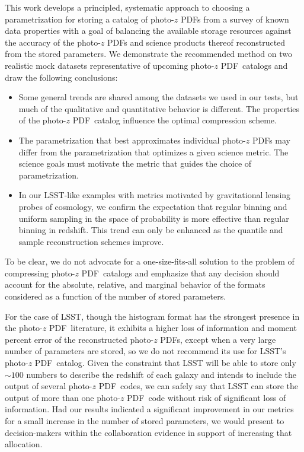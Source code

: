 \documentclass[\docopts]{\docclass}
\newcommand{\pz}{photo-$z$ PDF}
\begin{document}
This work develops a principled, systematic approach to choosing a 
parametrization for storing a catalog of \pz s from a survey of known data 
properties with a goal of balancing the available storage resources against the 
accuracy of the \pz s and science products thereof reconstructed from the 
stored parameters.
We demonstrate the recommended method on two realistic mock datasets 
representative of upcoming \pz\ catalogs and draw the following conclusions:
\begin{itemize}
  \item Some general trends are shared among the datasets we used in our tests, 
but much of the qualitative and quantitative behavior is different.
  The properties of the \pz\ catalog influence the optimal compression scheme.
  \item The parametrization that best approximates individual \pz s may differ 
from the parametrization that optimizes a given science metric.
  The science goals must motivate the metric that guides the choice of 
parametrization.
  \item In our LSST-like examples with metrics motivated by gravitational 
lensing probes of cosmology, we confirm the expectation that regular binning 
and uniform sampling in the space of probability is more effective than regular 
binning in redshift.
  This trend can only be enhanced as the quantile and sample reconstruction 
schemes improve.
\end{itemize}
To be clear, we do not advocate for a one-size-fits-all solution to the problem 
of compressing \pz\ catalogs and emphasize that any decision should account for 
the absolute, relative, and marginal behavior of the formats considered as a 
function of the number of stored parameters.

For the case of LSST, though the histogram format has the strongest presence in 
the \pz\ literature, it exhibits a higher loss of information and moment 
percent error of the reconstructed \pz s, except when a very large number of 
parameters are stored, so we do not recommend its use for LSST's \pz\ catalog.
Given the constraint that LSST will be able to store only $\sim100$ numbers to 
describe the redshift of each galaxy and intends to include the output of 
several \pz\ codes, we can safely say that LSST can store the output of more 
than one \pz\ code without risk of significant loss of information.
Had our results indicated a significant improvement in our metrics for a small 
increase in the number of stored parameters, we would present to 
decision-makers within the collaboration evidence in support of increasing that 
allocation.
\end{document}
